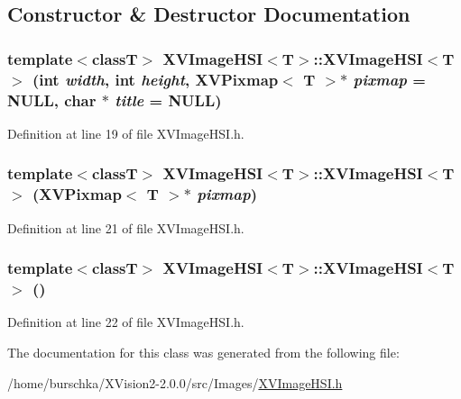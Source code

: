 \subsection{Constructor \& Destructor Documentation}
\label{XVImageHSI_a0}
\hypertarget{class_XVImageHSI_a0}{
\subsubsection[XVImageHSI]{\setlength{\rightskip}{0pt plus 5cm}template$<$classT$>$ XVImage\-HSI$<$T$>$::XVImage\-HSI$<$T$>$ (int {\em width}, int {\em height}, XVPixmap$<$ T $>$$\ast$ {\em pixmap} = NULL, char $\ast$ {\em title} = NULL)}}




Definition at line 19 of file XVImage\-HSI.h.\label{XVImageHSI_a1}
\hypertarget{class_XVImageHSI_a1}{
\subsubsection[XVImageHSI]{\setlength{\rightskip}{0pt plus 5cm}template$<$classT$>$ XVImage\-HSI$<$T$>$::XVImage\-HSI$<$T$>$ (XVPixmap$<$ T $>$$\ast$ {\em pixmap})}}




Definition at line 21 of file XVImage\-HSI.h.\label{XVImageHSI_a2}
\hypertarget{class_XVImageHSI_a2}{
\subsubsection[XVImageHSI]{\setlength{\rightskip}{0pt plus 5cm}template$<$classT$>$ XVImage\-HSI$<$T$>$::XVImage\-HSI$<$T$>$ ()}}




Definition at line 22 of file XVImage\-HSI.h.

The documentation for this class was generated from the following file:\begin{CompactItemize}
\item 
/home/burschka/XVision2-2.0.0/src/Images/\hyperlink{XVImageHSI.h-source}{XVImage\-HSI.h}\end{CompactItemize}
